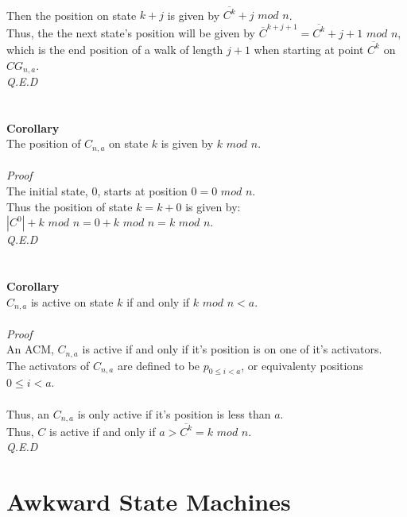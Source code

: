 \documentclass[a4paper,12pt]{article}
\begin{document}
\\
Then the position on state $k + j$ is given by $\overline{C^k} + j$ $mod$ $n$.\\
Thus, the the next state's position will be given by $\overline{C}^{k + j + 1} = \overline{C^k} + j + 1$ $mod$ $n$, which is the end position of a walk of length $j + 1$ when starting at point $\overline{C^k}$ on $CG_{n,a}$.\\
\textit{Q.E.D}\\
\\
\\
\textbf{Corollary}\\
The position of $C_{n,a}$ on state $k$ is given by $k$ $mod$ $n$.\\
\\
\textit{Proof}\\ 
The initial state, $0$, starts at position $0 = 0$ $mod$ $n$.\\
Thus the position of state $k = k + 0$ is given by:\\
$|C^0| + k$ $mod$ $n = 0 + k$ $mod$ $n = k$ $mod$ $n$.\\
\textit{Q.E.D}\\   
\\
\\
\textbf{Corollary}\\
$C_{n,a}$ is active on state $k$ if and only if $k$ $mod$ $n < a$.\\
\\
\textit{Proof}\\
An ACM, $C_{n,a}$ is active if and only if it's position is on one of it's activators.\\
The activators of $C_{n,a}$ are defined to be $p_{0 \leq i < a}$, or equivalenty positions $0 \leq i < a$.\\
\\
Thus, an $C_{n,a}$ is only active if it's position is less than $a$.\\
Thus, $C$ is active if and only if $a > \overline{C^k} = k$ $mod$ $n$.\\
\textit{Q.E.D} 
  
\section{Awkward State Machines}
\end{document}

